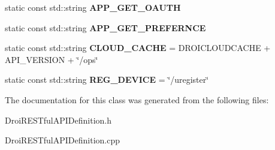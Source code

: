 \begin{DoxyCompactItemize}
static const std\+::string {\bfseries A\+P\+P\+\_\+\+G\+E\+T\+\_\+\+O\+A\+U\+TH}
\item 
\mbox{\label{class_droi_r_e_s_tful_a_p_i_definition_ae565c189fb48bfafd23f9c9f2552312d}} 
static const std\+::string {\bfseries A\+P\+P\+\_\+\+G\+E\+T\+\_\+\+P\+R\+E\+F\+E\+R\+N\+CE}
\item 
\mbox{\label{class_droi_r_e_s_tful_a_p_i_definition_a2c398974ef2253fe251180723c0b1d7b}} 
static const std\+::string {\bfseries C\+L\+O\+U\+D\+\_\+\+C\+A\+C\+HE} = D\+R\+O\+I\+C\+L\+O\+U\+D\+C\+A\+C\+HE + A\+P\+I\+\_\+\+V\+E\+R\+S\+I\+ON + \char`\"{}/ops\char`\"{}
\item 
\mbox{\label{class_droi_r_e_s_tful_a_p_i_definition_a2928506e634131b9e9671120b43ac53e}} 
static const std\+::string {\bfseries R\+E\+G\+\_\+\+D\+E\+V\+I\+CE} = \char`\"{}/uregister\char`\"{}
\end{DoxyCompactItemize}


The documentation for this class was generated from the following files\+:\begin{DoxyCompactItemize}
\item 
Droi\+R\+E\+S\+Tful\+A\+P\+I\+Definition.\+h\item 
Droi\+R\+E\+S\+Tful\+A\+P\+I\+Definition.\+cpp\end{DoxyCompactItemize}
